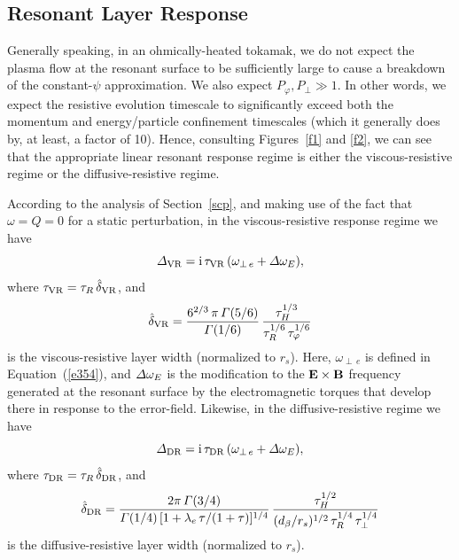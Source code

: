 \documentclass[notitlepage,12pt]{article}
\begin{document}
\subsection{Resonant Layer Response}
Generally speaking, in an ohmically-heated tokamak, we do not expect the plasma flow at the resonant surface to be sufficiently
large to cause a breakdown of the constant-$\psi$ approximation. We also expect $P_\varphi, P_\perp \gg 1$. In other
words, we expect the resistive evolution timescale to significantly exceed both the momentum and energy/particle
confinement timescales (which it generally does by, at least, a factor of 10). Hence, consulting Figures~\ref{f1} and \ref{f2},
we can see that the appropriate linear resonant response regime is either the viscous-resistive regime or the diffusive-resistive
regime. 

According to the analysis of Section~\ref{scp}, and making use of the fact that $\omega=Q=0$ for a static perturbation, 
in the viscous-resistive response regime we have
\begin{equation}
{\mit\Delta}_{\rm VR} = {\rm i}\,\tau_{\rm VR}\,(\omega_{\perp\,e}+{\mit\Delta}\omega_E),
\end{equation}
where $\tau_{\rm VR} = \tau_R\,\hat{\delta}_{\rm VR}$, and
\begin{equation}
\hat{\delta}_{\rm VR} = \frac{6^{2/3}\,\pi\,{\mit\Gamma}(5/6)}{{\mit\Gamma}(1/6)}\,\frac{\tau_H^{1/3}}{\tau_R^{1/6}\,\tau_\varphi^{1/6}}
\end{equation}
is the viscous-resistive layer width (normalized to $r_s$). Here, $\omega_{\perp\,e}$ is defined in Equation~(\ref{e354}), and
${\mit\Delta}\omega_E$ is the modification to the ${\bf E}\times{\bf B}$ frequency generated at the resonant surface by
the electromagnetic torques that develop there in response to the error-field. Likewise, in the
diffusive-resistive regime we have
\begin{equation}
{\mit\Delta}_{\rm DR} = {\rm i}\,\tau_{\rm DR}\,(\omega_{\perp\,e}+{\mit\Delta}\omega_E),
\end{equation}
where $\tau_{\rm DR} = \tau_R\,\hat{\delta}_{\rm DR}$, and
\begin{equation}
\hat{\delta}_{\rm DR} = \frac{2\pi\,{\mit\Gamma}(3/4)}{{\mit\Gamma}(1/4)\,[1+\lambda_e\,\tau/(1+\tau)]^{1/4}}\,
\frac{\tau_H^{1/2}}{(d_\beta/r_s)^{1/2}\,\tau_R^{1/4}\,\tau_\perp^{1/4}}
\end{equation}
is the diffusive-resistive layer width (normalized to $r_s$).
\end{document}
